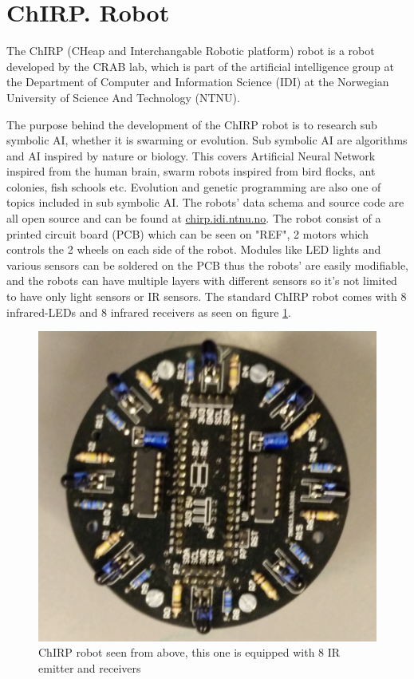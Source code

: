 \section{ChIRP. Robot}
The ChIRP (CHeap and Interchangable Robotic platform) robot is a robot developed by the CRAB lab, which is part of the artificial intelligence group at the Department of Computer and Information Science (IDI) at the Norwegian University of Science And Technology (NTNU).

The purpose behind the development of the ChIRP robot is to research sub symbolic AI, whether it is swarming or evolution. Sub symbolic AI are algorithms and AI inspired by nature or biology. This covers Artificial Neural Network inspired from the human brain, swarm robots inspired from bird flocks, ant colonies, fish schools etc. Evolution and genetic programming are also one of topics included in sub symbolic AI.
The robots' data schema and source code are all open source and can be found at \href{http://chirp.idi.ntnu.no}{chirp.idi.ntnu.no}. The robot consist of a printed circuit board (PCB) which can be seen on "REF", 2 motors which controls the 2 wheels on each side of the robot.
Modules like LED lights and various sensors can be soldered on the PCB thus the robots' are easily modifiable, and the robots can have multiple layers with different sensors so it's not limited to have only light sensors or IR sensors. The standard ChIRP robot comes with 8 infrared-LEDs and 8 infrared receivers as seen on figure \ref{fig:chirpAbove}.
\begin{figure}[H]
\centering
\includegraphics[width=0.8\linewidth]{images/chirpAbove.jpg}
\caption[ChIRP robot seen from above]{ChIRP robot seen from above, this one is equipped with 8 IR emitter and receivers}
\label{fig:chirpAbove}
\end{figure}

